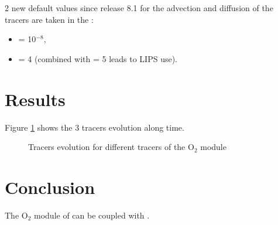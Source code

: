 2 new default values since release 8.1 for the advection and diffusion of the
tracers are taken in the   :
\begin{itemize}
\item {} = 10$^{-8}$,
\item {} = 4
  (combined with  = 5 leads to LIPS use).
\end{itemize}

\section{Results}

Figure \ref{fig:waq3d_o2:res} shows the 3 tracers evolution along time.

\begin{figure} [H]
\centering
{}
 \caption{Tracers evolution for different tracers of the O$_2$ module}
 \label{fig:waq3d_o2:res}
\end{figure}

\section{Conclusion}

The O$_2$ module of \waqtel can be coupled with .
